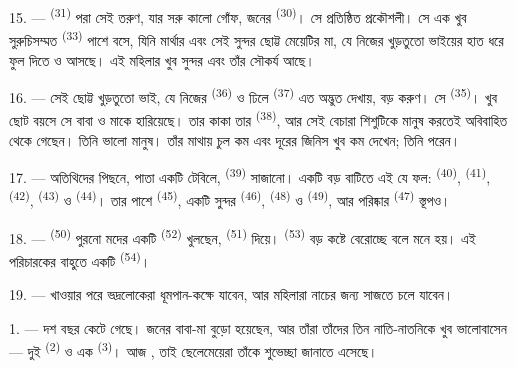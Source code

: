 15. ---  \textsuperscript{(31)} পরা সেই তরুণ, যার সরু কালো
গোঁফ, জনের  \textsuperscript{(30)}। সে প্রতিষ্ঠিত প্রকৌশলী। সে
এক খুব সুরুচিসম্মত  \textsuperscript{(33)} পাশে বসে, যিনি
মার্থার  এবং সেই সুন্দর ছোট্ট মেয়েটির মা, যে নিজের
খুড়তুতো ভাইয়ের হাত ধরে ফুল দিতে ও 
 আসছে। এই মহিলার  খুব সুন্দর এবং তাঁর
 সৌকর্য আছে।

16. --- সেই ছোট্ট খুড়তুতো ভাই, যে নিজের  \textsuperscript{(36)}
ও ঢিলে  \textsuperscript{(37)} এত অদ্ভুত দেখায়, বড় করুণ। সে
 \textsuperscript{(35)}। খুব ছোট বয়সে সে বাবা ও মাকে হারিয়েছে।
তার কাকা তার  \textsuperscript{(38)}, আর সেই বেচারা শিশুটিকে
মানুষ করতেই অবিবাহিত থেকে গেছেন। তিনি ভালো মানুষ। তাঁর মাথায় চুল কম এবং
দূরের জিনিস খুব কম দেখেন; তিনি  পরেন।

\VUsaut{2.4mm}
\VUsaut{3.0mm}

17. --- অতিথিদের পিছনে,  পাতা একটি টেবিলে,
 \textsuperscript{(39)} সাজানো। একটি বড় বাটিতে এই যে ফল:
 \textsuperscript{(40)},  \textsuperscript{(41)},
 \textsuperscript{(42)},  \textsuperscript{(43)} ও
 \textsuperscript{(44)}। তার পাশে 
\textsuperscript{(45)}, একটি সুন্দর  \textsuperscript{(46)},
 \textsuperscript{(48)} ও 
\textsuperscript{(49)}, আর পরিষ্কার  \textsuperscript{(47)} স্তূপও।

18. ---  \textsuperscript{(50)} পুরনো মদের একটি
 \textsuperscript{(52)} খুলছেন, 
\textsuperscript{(51)} দিয়ে।  \textsuperscript{(53)} বড় কষ্টে বেরোচ্ছে
বলে মনে হয়। এই পরিচারকের বাহুতে একটি  \textsuperscript{(54)}।

19. --- খাওয়ার পরে ভদ্রলোকেরা ধূমপান-কক্ষে যাবেন, আর মহিলারা নাচের জন্য
সাজতে চলে যাবেন।

\VUsaut{5.0mm}
\VUsaut{1.6mm}
\VUsaut{2.6mm}

\VUsaut{3.0mm}

1. --- দশ বছর কেটে গেছে। জনের বাবা-মা বুড়ো হয়েছেন, আর তাঁরা তাঁদের তিন
নাতি-নাতনিকে খুব ভালোবাসেন --- দুই  \textsuperscript{(2)} ও এক
 \textsuperscript{(3)}। আজ , তাই ছেলেমেয়েরা
তাঁকে শুভেচ্ছা জানাতে এসেছে।

